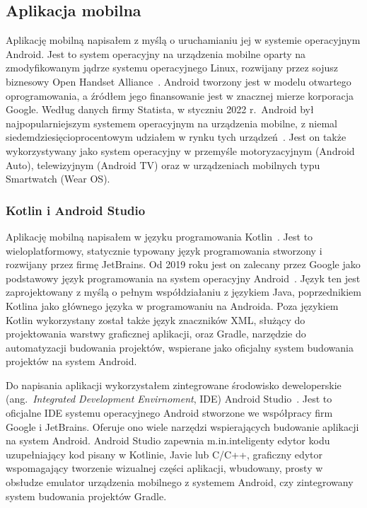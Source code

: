\newpage            
	\subsection{Aplikacja mobilna}
	Aplikację mobilną napisałem z myślą o uruchamianiu jej w systemie operacyjnym Android. Jest to system operacyjny na urządzenia mobilne oparty na zmodyfikowanym jądrze systemu operacyjnego Linux, 
	rozwijany przez sojusz biznesowy Open Handset Alliance~\cite{OHA}. Android tworzony jest w modelu otwartego oprogramowania, a źródłem jego finansowanie jest w znacznej mierze korporacja Google.
	Według danych firmy Statista, w styczniu 2022 r.\ Android był najpopularniejszym systemem operacyjnym na urządzenia mobilne, z niemal siedemdziesięcioprocentowym 
	udziałem w rynku tych urządzeń~\cite{OS_SHARE}. Jest on także wykorzystywany jako system operacyjny w przemyśle motoryzacyjnym (Android Auto), telewizyjnym (Android TV) oraz
	w urządzeniach mobilnych typu Smartwatch (Wear OS).

		\subsubsection{Kotlin i Android Studio}
		Aplikację mobilną napisałem w języku programowania Kotlin~\cite{KT_MAIN}. Jest to wieloplatformowy, statycznie typowany język programowania stworzony i rozwijany przez firmę JetBrains.
		Od 2019 roku jest on zalecany przez Google jako podstawowy język programowania na system operacyjny Android~\cite{ANDROID_KT}. Język ten jest zaprojektowany z myślą o
		pełnym współdziałaniu z językiem Java, poprzednikiem Kotlina jako głównego języka w programowaniu na Androida. Poza językiem Kotlin wykorzystany został także język znaczników XML, służący do projektowania warstwy graficznej aplikacji, oraz Gradle, narzędzie do automatyzacji budowania projektów, 
		wspierane jako oficjalny system budowania projektów na system Android. 

		Do napisania aplikacji wykorzystałem zintegrowane środowisko deweloperskie (ang.\ \emph{Integrated Development Envirnoment}, IDE) Android Studio~\cite{MEET_AS}. Jest to oficjalne IDE systemu operacyjnego
		Android stworzone we współpracy firm Google i JetBrains. Oferuje ono wiele narzędzi wspierających budowanie aplikacji na system Android. Android Studio zapewnia m.in.\@ inteligenty edytor kodu
		uzupełniający kod pisany w Kotlinie, Javie lub C/C++, graficzny edytor wspomagający tworzenie wizualnej części aplikacji, wbudowany, prosty w obsłudze emulator urządzenia mobilnego z 
		systemem Android, czy zintegrowany system budowania projektów Gradle. 

